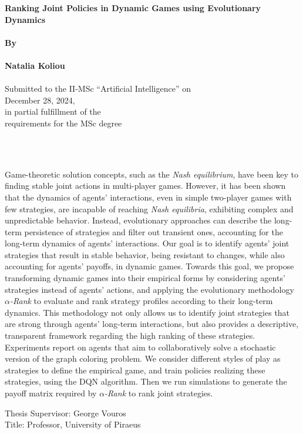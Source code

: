 \begin{center}
    \Large{\textbf{Ranking Joint Policies in Dynamic Games using Evolutionary Dynamics}} \\~\\
    \Large{\textbf{By}} \\~\\
    \Large{\textbf{Natalia Koliou}} \\~\\
    
    \large{Submitted to the II-MSc “Artificial Intelligence” on \\ December 28, 2024, \\ in partial fulfillment of the \\ requirements for the MSc degree \\~\\}
\end{center}

\renewenvironment{abstract}
 {\par\noindent\textbf{\abstractname}\ \ignorespaces}
 {\par\medskip}

\begin{abstract}
    
    \vspace{5pt}
    \setlength{\parindent}{0pt}

    Game-theoretic solution concepts, such as the \emph{Nash equilibrium}, have been key to finding stable joint actions in multi-player games. However, it has been shown that the dynamics of agents' interactions, even in simple two-player games with few strategies, are incapable of reaching \emph{Nash equilibria}, exhibiting complex and unpredictable behavior. Instead, evolutionary approaches can describe the long-term persistence of strategies and filter out transient ones, accounting for the long-term dynamics of agents' interactions. Our goal is to identify agents' joint strategies that result in stable behavior, being resistant to changes, while also accounting for agents' payoffs, in dynamic games. Towards this goal, we propose transforming dynamic games into their empirical forms by considering agents' strategies instead of agents' actions, and applying the evolutionary methodology \emph{$\alpha$-Rank} to evaluate and rank strategy profiles according to their long-term dynamics. This methodology not only allows us to identify joint strategies that are strong through agents' long-term interactions, but also provides a descriptive, transparent framework regarding the high ranking of these strategies. Experiments report on agents that aim to collaboratively solve a stochastic version of the graph coloring problem. We consider different styles of play as strategies to define the empirical game, and train policies realizing these strategies, using the DQN algorithm. Then we run simulations to generate the payoff matrix required by \emph{$\alpha$-Rank} to rank joint strategies.\smalldouble
    
    \noindent
    Thesis Supervisor:  George Vouros\\
    Title: Professor, University of Piraeus\\

\end{abstract}